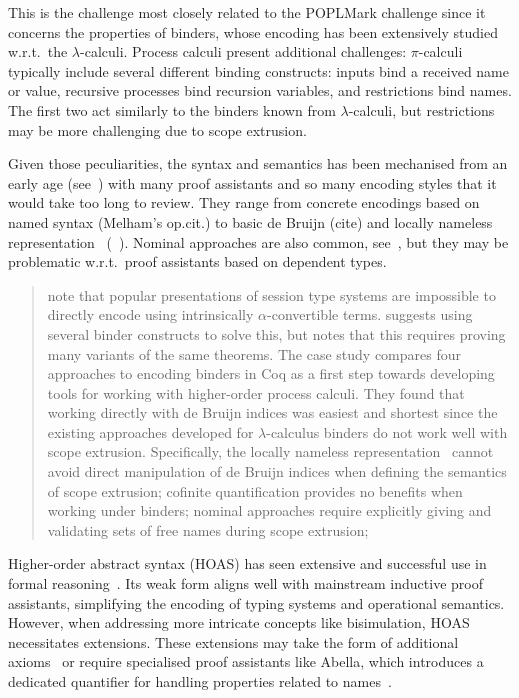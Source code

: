 \documentclass[runningheads]{llncs}
\begin{document}
This is the challenge most closely related to the POPLMark challenge
since it concerns the properties of binders, whose encoding has been
extensively studied w.r.t.\ the $\lambda$-calculi. Process calculi
present additional challenges: $\pi$-calculi typically include several
different binding constructs: inputs bind a received name or value,
recursive processes bind recursion variables, and restrictions bind
names.  The first two act similarly to the binders known from
$\lambda$-calculi, but restrictions may be more challenging due to
scope extrusion.

Given those peculiarities, the syntax and semantics has been
mechanised from an early age (see~\cite{Melham1994}) with many proof
assistants and so many encoding styles that it would take too long to
review.  They range from concrete encodings based on named syntax
(Melham's op.cit.) to basic de Bruijn (cite) and locally nameless
representation~\cite{Chargueraud2012} (\eg~\cite{Castro2020}).
Nominal approaches are also common, see~\cite{Bengtson2009}, but they
may be problematic w.r.t.~proof assistants based on dependent types.

\begin{quotation}
\cite{Castro-Perez2021,Castro2020} note that popular presentations of
session type systems are impossible to directly encode using
intrinsically \(\alpha\)-convertible terms.  \cite{Castro2020}
suggests using several binder constructs to solve this, but notes that
this requires proving many variants of the same theorems.
The case study \cite{AmbalLS21} compares four approaches to encoding
binders in Coq as a first step towards developing tools for working
with higher-order process calculi.  They found that working directly
with de Bruijn indices was easiest and shortest since the existing
approaches developed for $\lambda$-calculus binders do not work well
with scope extrusion.  Specifically, the locally nameless
representation~\cite{Chargueraud2012} cannot avoid direct manipulation
of de Bruijn indices when defining the semantics of scope extrusion;
cofinite quantification provides no benefits when working under
binders; nominal approaches require explicitly giving
and validating sets of free names during scope extrusion;
\end{quotation}


Higher-order abstract syntax (HOAS) has seen extensive and successful
use in formal reasoning~\cite{Despeyroux2000,Honsell2001,Tiu2010}. Its
weak form aligns well with mainstream inductive proof assistants,
simplifying the encoding of typing systems and operational
semantics. However, when addressing more intricate concepts like
bisimulation, HOAS necessitates extensions. These extensions may take
the form of additional axioms~\cite{Honsell2001} or require specialised proof assistants
like Abella, which introduces a dedicated quantifier for handling
properties related to names~\cite{GacekMN11}.
\end{document}
